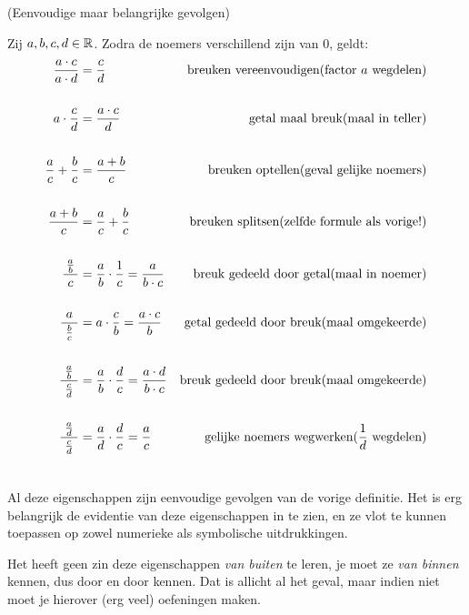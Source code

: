\documentclass[numbers]{ximera}
\begin{document}
\begin{proposition} (Eenvoudige maar belangrijke gevolgen)
\nopagebreak[4]    %
	
	Zij $a,b,c,d\in \mathbb{R}$. Zodra de noemers verschillend zijn van $0$, geldt:
{
\begin{align*}
		\frac{a\cdot c}{a\cdot d} &= \frac{c}{d} 
			& \text{breuken vereenvoudigen} \hfill\text{(factor $a$ wegdelen)} \\ \\
		a\cdot \frac{c}{d}   &= \frac{a\cdot c}{d} 
			& \text{getal maal breuk}\hfill \text{(maal in teller)} \\ \\
		\frac{a}{c}+\frac{b}{c}  &= \frac{a+b}{c} 
			& \text{breuken optellen}\hfill\text{(geval gelijke noemers)} \\ \\
		\frac{a+b}{c} &= \frac{a}{c}+\frac{b}{c}  
			& \text{breuken splitsen} \hfill\text{(zelfde formule als vorige!)}\\ \\
		\frac{\frac{a}{b}}{\ c\ } &= \frac ab \cdot \frac 1c = \frac{a}{b\cdot c} 
		& \text{breuk gedeeld door getal}\hfill\text{(maal in noemer)}\\ \\
		\frac{a}{\ \frac{b}{c}\ } &= a\cdot \frac cb = \frac{a\cdot c}{b}
		& \text{getal gedeeld door breuk}\hfill\text{(maal omgekeerde)}\\ \\
		\frac{\frac{a}{b}}{\ \frac{c}{d}\ } &= \frac ab \cdot \frac dc =  \frac{a\cdot d}{b\cdot c}
		& \text{breuk gedeeld door breuk}\hfill\text{(maal omgekeerde)}\\ \\
		\frac{\frac{a}{d}}{\ \frac{c}{d}\ } &= \frac ad \cdot \frac dc =  \frac{a}{c}
		& \text{gelijke noemers wegwerken}\hfill\text{($\frac 1d$ wegdelen)}\\ \\
		\end{align*}
}
\end{proposition}


Al deze eigenschappen zijn eenvoudige gevolgen van de vorige definitie. Het is erg belangrijk de evidentie van deze eigenschappen in te zien, en ze vlot te kunnen toepassen op zowel numerieke als symbolische uitdrukkingen.

Het heeft geen zin deze eigenschappen \textit{van buiten} te leren, je moet ze \textit{van binnen} kennen, dus door en door kennen. Dat is allicht al het geval, maar indien niet moet je hierover (erg veel) oefeningen maken.
\end{document}

